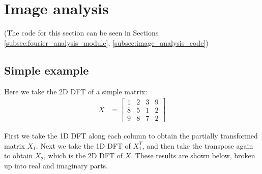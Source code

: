\documentclass[twocolumn]{myarticle}
\begin{document}
\section{Image analysis}
\label{sec:image_analysis}

(The code for this section can be seen in Sections \ref{subsec:fourier_analysis_module}, \ref{subsec:image_analysis_code})

\subsection{Simple example}
\label{subsec:simple_example}

Here we take the 2D DFT of a simple matrix:
\begin{align}
    X &= \begin{bmatrix} 1 & 2 & 3 & 9 \\ 8 & 5 & 1 & 2 \\ 9 & 8 & 7 & 2 \end{bmatrix}
\end{align}

First we take the 1D DFT along each column to obtain the partially transformed matrix $ X_1 $.
Next we take the 1D DFT of $ X_1^T $, and then take the transpose again to obtain $ X_2 $, which is the 2D DFT of $ X $.
These results are shown below, broken up into real and imaginary parts.
\end{document}
